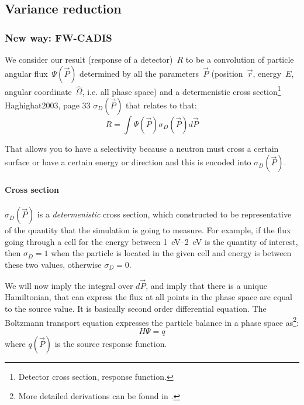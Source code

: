 \subsection{Variance reduction}

\subsubsection{New way: FW-CADIS}

 We
consider our result (response of a detector)~$R$ to be a convolution
of particle angular flux~$\Psi(\vec{P})$ determined by all the
parameters~$\vec{P}$ (position~$\vec{r}$, energy~$E$, angular
coordinate~$\hat{\Omega}$, i.e. all phase space) and a determenistic
cross section\footnote{Detector cross section, response function.} %
Haghighat2003, page 33 $\sigma_D(\vec{P})$ that relates to that:
\begin{equation}
  \label{eq:vr:result}
  R = \int \Psi(\vec{P}) \sigma_D(\vec{P}) d\vec{P}
\end{equation}

That allows you to have a selectivity because a neutron must cross a
certain surface or have a certain energy or direction and this is encoded into $\sigma_D(\vec{P})$.

\paragraph{Cross section}
$\sigma_D(\vec{P})$ is a {\em determenistic} cross section, which constructed to be representative of the quantity
that the simulation is going to measure. For example, if the flux going through a cell for the energy between
\SIrange[range-phrase=\ and\ ]{1}{2}{\electronvolt} is the quantity of interest, then
$\sigma_D=1$ when the particle is located in the given cell and energy is between these two values,
otherwise $\sigma_D=0$.

\bigskip

We will now imply the integral over $d\vec{P}$, and imply that there is a unique Hamiltonian,
that can express the flux at all points in the phase space are equal to the source value. It is basically
second order differential equation. The Boltzmann transport equation expresses the particle balance in a phase space as\footnote{More detailed derivations can be found in \cite{Haghighat2003}.}:
\begin{equation}
  \label{eq:vr:Hamiltonian}
  H \Psi = q
\end{equation}
where $q(\vec{P})$ is the source response function.

